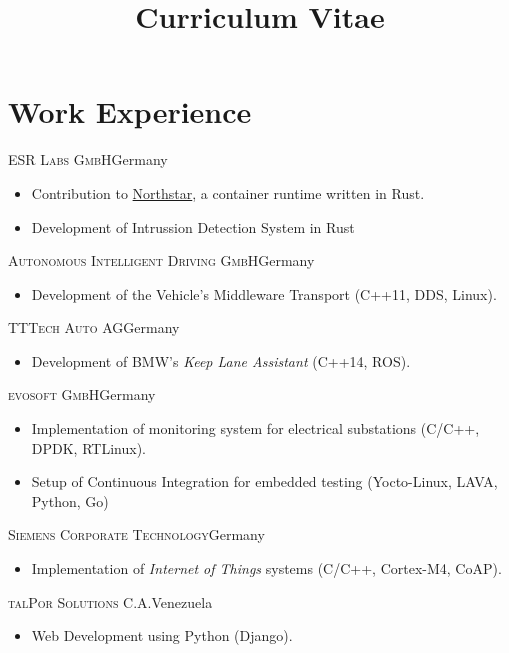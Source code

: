 \documentclass[10pt]{moderncv}
\title{Curriculum Vitae}
\begin{document}
\maketitle

\section{Work Experience}

{\textsc{ESR Labs GmbH}}{Germany}{}{%
\begin{itemize}
    \item Contribution to
        \href{https://github.com/esrlabs/northstar}{Northstar}, a container
        runtime written in Rust.
    \item Development of Intrussion Detection System in Rust
\end{itemize}
}

{\textsc{Autonomous Intelligent Driving GmbH}}{Germany}{}{%
\begin{itemize}
  \item Development of the Vehicle's Middleware Transport (C++11, DDS, Linux).
\end{itemize}
}

{\textsc{TTTech Auto AG}}{Germany}{}{%
\begin{itemize}
  \item Development of BMW's \textit{Keep Lane Assistant} (C++14, ROS).
\end{itemize}
}

{\textsc{evosoft GmbH}}{Germany}{}{%
\begin{itemize}
  \item Implementation of monitoring system for electrical substations
    (C/C++, DPDK, RTLinux).
  \item Setup of Continuous Integration for embedded testing (Yocto-Linux,
    LAVA, Python, Go)
\end{itemize}
}

{\textsc{Siemens Corporate Technology}}{Germany}{}{%
\begin{itemize}
  \item Implementation of \textit{Internet of Things} systems (C/C++, Cortex-M4, CoAP).
\end{itemize}
}

{\textsc{talPor Solutions C.A.}}{Venezuela}{}{%
\begin{itemize}
  \item Web Development using Python (Django).
\end{itemize}
}
\end{document}
